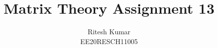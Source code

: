 \documentclass[journal,12pt,twocolumn]{IEEEtran}
\DeclareMathOperator*{\Res}{Res}
\begin{document}
	
	
	\newtheorem{theorem}{Theorem}[section]
	\newtheorem{problem}{Problem}
	\newtheorem{proposition}{Proposition}[section]
	\newtheorem{lemma}{Lemma}[section]
	\newtheorem{corollary}[theorem]{Corollary}
	\newtheorem{example}{Example}[section]
	\newtheorem{definition}[problem]{Definition}
	
	\newcommand{\BEQA}{\begin{eqnarray}}
	\newcommand{\EEQA}{\end{eqnarray}}
	\newcommand{\define}{\stackrel{\triangle}{=}}
	
	\providecommand{\mbf}{\mathbf}
	\providecommand{\pr}[1]{\ensuremath{\Pr\left(#1\right)}}
	\providecommand{\qfunc}[1]{\ensuremath{Q\left(#1\right)}}
	\providecommand{\sbrak}[1]{\ensuremath{{}\left[#1\right]}}
	\providecommand{\lsbrak}[1]{\ensuremath{{}\left[#1\right.}}
	\providecommand{\rsbrak}[1]{\ensuremath{{}\left.#1\right]}}
	\providecommand{\brak}[1]{\ensuremath{\left(#1\right)}}
	\providecommand{\lbrak}[1]{\ensuremath{\left(#1\right.}}
	\providecommand{\rbrak}[1]{\ensuremath{\left.#1\right)}}
	\providecommand{\cbrak}[1]{\ensuremath{\left\{#1\right\}}}
	\providecommand{\lcbrak}[1]{\ensuremath{\left\{#1\right.}}
	\providecommand{\rcbrak}[1]{\ensuremath{\left.#1\right\}}}
	\theoremstyle{remark}
	\newtheorem{rem}{Remark}
	\newcommand{\sgn}{\mathop{\mathrm{sgn}}}
	\providecommand{\abs}[1]{\left\vert#1\right\vert}
	\providecommand{\res}[1]{\Res\displaylimits_{#1}} 
	\providecommand{\norm}[1]{\left\lVert#1\right\rVert}
	\providecommand{\mtx}[1]{\mathbf{#1}}
	\providecommand{\mean}[1]{E\left[ #1 \right]}
	\providecommand{\fourier}{\overset{\mathcal{F}}{ \rightleftharpoons}}
	\providecommand{\system}{\overset{\mathcal{H}}{ \longleftrightarrow}}
	\newcommand{\solution}{\noindent \textbf{Solution: }}
	\newcommand{\cosec}{\,\text{cosec}\,}
	\providecommand{\dec}[2]{\ensuremath{\overset{#1}{\underset{#2}{\gtrless}}}}
	\newcommand{\myvec}[1]{\ensuremath{\begin{pmatrix}#1\end{pmatrix}}}
	\newcommand{\mydet}[1]{\ensuremath{\begin{vmatrix}#1\end{vmatrix}}}
	\makeatletter
	\makeatother
	\let\StandardTheFigure\thefigure
	\let\vec\mathbf
	\renewcommand{\thefigure}{\theproblem}
	\def\putbox#1#2#3{\makebox[0in][l]{\makebox[#1][l]{}\raisebox{\baselineskip}[0in][0in]{\raisebox{#2}[0in][0in]{#3}}}}
	\def\rightbox#1{\makebox[0in][r]{#1}}
	\def\centbox#1{\makebox[0in]{#1}}
	\def\topbox#1{\raisebox{-\baselineskip}[0in][0in]{#1}}
	\def\midbox#1{\raisebox{-0.5\baselineskip}[0in][0in]{#1}}
	\vspace{3cm}
	\title{Matrix Theory Assignment 13}
	\author{Ritesh Kumar \\ EE20RESCH11005}
	
\end{document}
